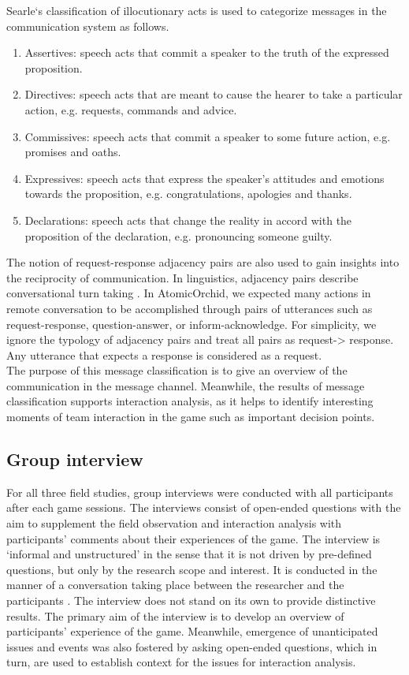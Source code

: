 Searle`s classification of illocutionary acts is used to categorize messages in the communication system as follows.\\

\begin{enumerate}
\item Assertives: speech acts that commit a speaker to the truth of the expressed proposition.
\item Directives: speech acts that are meant to cause the hearer to take a particular action, e.g. requests, commands and advice.
\item Commissives: speech acts that commit a speaker to some future action, e.g. promises and oaths.
\item Expressives: speech acts that express the speaker's attitudes and emotions towards the proposition, e.g. congratulations, apologies and thanks.
\item Declarations: speech acts that change the reality in accord with the proposition of the declaration, e.g. pronouncing someone guilty.
\end{enumerate}

The notion of request-response adjacency pairs are also used to gain insights into the reciprocity of communication. In linguistics, adjacency pairs describe conversational turn taking \cite{Avrahami}. In AtomicOrchid, we expected many actions in remote conversation to be accomplished through pairs of utterances such as request-response, question-answer, or inform-acknowledge. For simplicity, we ignore the typology of adjacency pairs and treat all pairs as request-> response. Any utterance that expects a response is considered as a request.\\

The purpose of this message classification is to give an overview of the communication in the message channel. Meanwhile, the results of message classification supports interaction analysis, as it helps to identify interesting moments of team interaction in the game such as important decision points.\\

\subsection{Group interview}
For all three field studies, group interviews were conducted with all participants after each game sessions. The interviews consist of open-ended questions with the aim to supplement the field observation and interaction analysis with participants' comments about their experiences of the game. The interview is `informal and unstructured' in the sense that it is not driven by pre-defined questions, but only by the research scope and interest. It is conducted in the manner of a conversation taking place between the researcher and the participants \cite{Crabtree2012}. The interview does not stand on its own to provide distinctive results. The primary aim of the interview is to develop an overview of participants' experience of the game. Meanwhile, emergence of unanticipated issues and events was also fostered by asking open-ended questions, which in turn, are used to establish context for the issues for interaction analysis.\\

